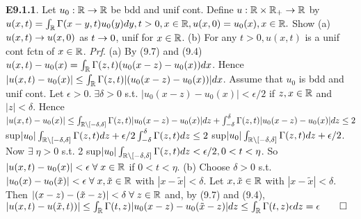 {\bf E9.1.1}. Let $u_0: \mathbb{R} \rightarrow \mathbb{R}$ be bdd and unif cont. Define $u: \mathbb{R} \times \mathbb{R}_+ \rightarrow \mathbb{R}$ by $u(x,t) = \int_{\mathbb{R}} \Gamma(x-y, t)u_0(y)dy, t > 0, x \in \mathbb{R}, u(x,0) = u_0(x), x \in \mathbb{R}.$  Show (a) $u(x,t) \rightarrow u(x,0)$ as $t \rightarrow 0$, unif for $x \in \mathbb{R}$. (b) For any $t >0, u(x,t)$ is a unif cont fctn of $x \in \mathbb{R}$.
{\it Prf}. (a) By (9.7) and (9.4) $u(x,t) - u_0(x) = \int_{\mathbb{R}} \Gamma(z,t)(u_0(x-z)-u_0(x))dx$. Hence $|u(x,t) - u_0(x)| \leq  \int_{\mathbb{R}} \Gamma(z,t) |(u_0(x-z)-u_0(x))|dx$. Assume that $u_0$ is bdd and unif cont. Let $\epsilon > 0. \; \exists \delta > 0$ s.t. $|u_0(x-z) - u_0(x)| < \epsilon/2$ if $z, x \in \mathbb{R}$ and $|z| < \delta$. Hence $|u(x,t) - u_0(x)| \leq  \int_{\mathbb{R} \setminus [-\delta, \delta]} \Gamma(z,t) |u_0(x-z)-u_0(x)|dz + \int_{-\delta}^{\delta} \Gamma(z,t) |u_0(x-z)-u_0(x)|dz \leq 2$ sup$|u_0| \int_{\mathbb{R} \setminus [-\delta, \delta]} \Gamma(z,t) dz + \epsilon/2 \int_{-\delta}^{\delta} \Gamma(z,t) dz \leq 2$ sup$|u_0| \int_{\mathbb{R} \setminus [-\delta, \delta]} \Gamma(z,t) dz + \epsilon/2$. Now $\exists \; \eta > 0$ s.t. 2 sup$|u_0| \int_{\mathbb{R} \setminus [-\delta, \delta]} \Gamma(z,t) dz < \epsilon/2, 0 < t < \eta$. So $|u(x,t) - u_0(x)| < \epsilon \; \forall \; x \in \mathbb{R}$ if $0 < t < \eta$. (b) Choose $\delta > 0$ s.t. $|u_0(x) - u_0(\tilde{x})| < \epsilon \; \forall \; x, \tilde{x} \in \mathbb{R}$ with $|x - \tilde x | < \delta$. Let $x, \tilde x \in \mathbb{R}$ with $|x - \tilde x | < \delta$. Then $|(x-z) - (\tilde x - z) | < \delta \; \forall \; z \in \mathbb{R}$ and, by (9.7) and (9.4), $|u(x,t) - u( \tilde x, t))| \leq \int_{\mathbb{R}} \Gamma(t,z)|u_0(x-z)- u_0(\tilde x - z)|dz \leq  \int_{\mathbb{R}} \Gamma(t,z) \epsilon dz = \epsilon \qed$